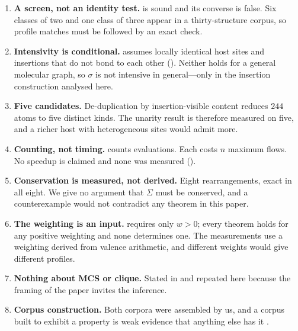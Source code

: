 \documentclass[11pt,twocolumn,a4paper]{article}
\theoremstyle{upthm}
\theoremstyle{definition}
\theoremstyle{remark}
\newcommand{\wt}{w}
\newcommand{\sep}{\sigma}
\begin{document}
\begin{enumerate}[label=\textbf{L\arabic*.},leftmargin=2.8em,itemsep=4pt]

\item \textbf{A screen, not an identity test.}  is
sound and its converse is false. Six classes of two and one class of
three appear in a thirty-structure corpus, so profile matches must be
followed by an exact check.

\item \textbf{Intensivity is conditional.} 
assumes locally identical host sites and insertions that do not bond to
each other (). Neither holds for a general
molecular graph, so $\sep$ is not intensive in general---only in the
insertion construction analysed here.

\item \textbf{Five candidates.} De-duplication by insertion-visible
content reduces $244$ atoms to five distinct kinds. The unarity result
is therefore measured on five, and a richer host with heterogeneous sites
would admit more.

\item \textbf{Counting, not timing.}  counts
evaluations. Each costs $n$ maximum flows. No speedup is claimed and none
was measured ().

\item \textbf{Conservation is measured, not derived.} Eight
rearrangements, exact in all eight. We give no argument that $\Sigma$
must be conserved, and a counterexample would not contradict any theorem
in this paper.

\item \textbf{The weighting is an input.}  requires only
$\wt>0$; every theorem holds for any positive weighting and none
determines one. The measurements use a weighting derived from valence
arithmetic, and different weights would give different profiles.

\item \textbf{Nothing about MCS or clique.} Stated in
 and repeated here because the framing of the paper
invites the inference.

\item \textbf{Corpus construction.} Both corpora were assembled by us,
and a corpus built to exhibit a property is weak evidence that anything
else has it \citep{ioannidis2005}.
\end{enumerate}
\end{document}
